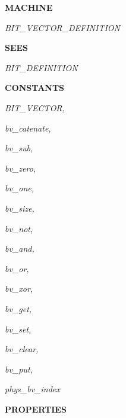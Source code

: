 

 

\bf MACHINE

\hspace*{0.20in}\it BIT\_VECTOR\_DEFINITION

\vspace*{4mm}
\bf SEES

\hspace*{0.20in}\it BIT\_DEFINITION

\vspace*{4mm}
\bf CONSTANTS

\hspace*{0.15in}

\hspace*{0.20in}\it BIT\_VECTOR\rm ,

\hspace*{0.20in}\it bv\_catenate\rm , 

\hspace*{0.20in}\it bv\_sub\rm , 

\hspace*{0.20in}\it bv\_zero\rm , 

\hspace*{0.20in}\it bv\_one\rm ,

\hspace*{0.20in}\it bv\_size\rm ,

\hspace*{0.20in}\it bv\_not\rm ,\hspace*{0.20in}

\hspace*{0.20in}\it bv\_and\rm ,\hspace*{0.20in}

\hspace*{0.20in}\it bv\_or\rm , 

\hspace*{0.20in}\it bv\_xor\rm ,

\hspace*{0.20in}\it bv\_get\rm , 

\hspace*{0.20in}\it bv\_set\rm , 

\hspace*{0.20in}\it bv\_clear\rm ,

\hspace*{0.20in}\it bv\_put\rm ,

\hspace*{0.20in}\it phys\_bv\_index

\vspace*{4mm}
\bf PROPERTIES

